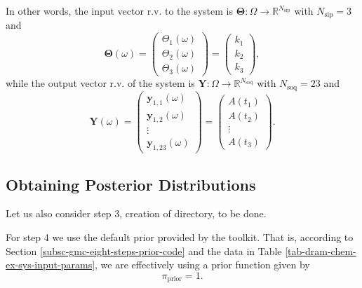 In other words, the input vector r.v. to the system is $\boldsymbol{\Theta}:\Omega\rightarrow\mathbb{R}^{N_{\text{sip}}}$ with $N_{\text{sip}}=3$ and
\begin{equation*}
\boldsymbol{\Theta}(\omega)
= 
\left(
\begin{array}{c}
\Theta_1(\omega) \\
\Theta_2(\omega) \\
\Theta_3(\omega)
\end{array}
\right)
= 
\left(
\begin{array}{c}
k_1 \\
k_2 \\
k_3
\end{array}
\right),
\end{equation*}
while the output vector r.v. of the system is $\mathbf{Y}:\Omega\rightarrow\mathbb{R}^{N_{\text{soq}}}$ with $N_{\text{soq}}=23$ and
\begin{equation*}
\mathbf{Y}(\omega)
= 
\left(
\begin{array}{c}
\mathbf{y}_{1,1}(\omega) \\
\mathbf{y}_{1,2}(\omega) \\
\vdots                   \\
\mathbf{y}_{1,23}(\omega)
\end{array}
\right)
= 
\left(
\begin{array}{c}
A(t_1) \\
A(t_2) \\
\vdots \\
A(t_3)
\end{array}
\right).
\end{equation*}

\clearpage
\subsection{Obtaining Posterior Distributions}

Let us also consider step 3, creation of directory, to be done.

For step 4
we use the default prior provided by the toolkit.
That is, according to Section \ref{subsc-gmc-eight-steps-prior-code}
and the data in Table \ref{tab-dram-chem-ex-sys-input-params}, we are effectively using a prior function given by
\begin{equation*}
\pi_{\text{prior}} = 1.
\end{equation*}

